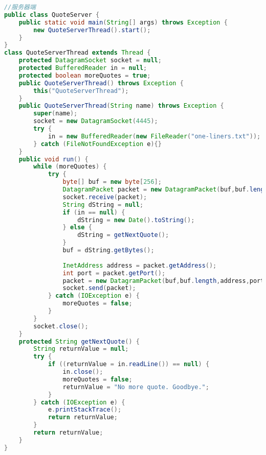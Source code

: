 \begin{lstlisting}[language=java]
//服务器端
public class QuoteServer {
	public static void main(String[] args) throws Exception {
		new QuoteServerThread().start();
	}
}
class QuoteServerThread extends Thread {
	protected DatagramSocket socket = null;
	protected BufferedReader in = null;
	protected boolean moreQuotes = true;
	public QuoteServerThread() throws Exception {
		this("QuoteServerThread");
	}
	public QuoteServerThread(String name) throws Exception {
		super(name);
		socket = new DatagramSocket(4445);
		try {
			in = new BufferedReader(new FileReader("one-liners.txt"));
		} catch (FileNotFoundException e){}
	}
	public void run() {
		while (moreQuotes) {
			try {
				byte[] buf = new byte[256];
				DatagramPacket packet = new DatagramPacket(buf,buf.length);
				socket.receive(packet);
				String dString = null;
				if (in == null) {
					dString = new Date().toString();
				} else {
					dString = getNextQuote();
				}
				buf = dString.getBytes();
				
				InetAddress address = packet.getAddress();
				int port = packet.getPort();
				packet = new DatagramPacket(buf,buf.length,address,port);
				socket.send(packet);
			} catch (IOException e) {
				moreQuotes = false;
			}
		}
		socket.close();
	}
	protected String getNextQuote() {
		String returnValue = null;
		try {
			if ((returnValue = in.readLine()) == null) {
				in.close();
				moreQuotes = false;
				returnValue = "No more quote. Goodbye.";
			}
		} catch (IOException e) {
			e.printStackTrace();
			return returnValue;
		}
		return returnValue;
	}
}
\end{lstlisting}
